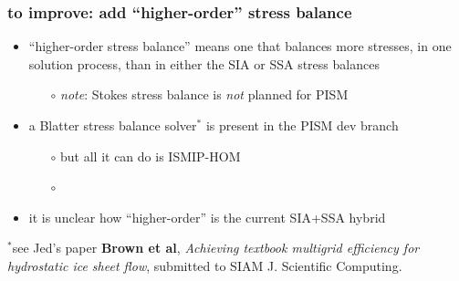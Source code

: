 \documentclass[hide notes,intlimits]{beamer}
\begin{document}
\begin{frame}
  \frametitle{to improve: add ``higher-order'' stress balance}
  \begin{itemize}
  \item ``higher-order stress balance'' means one that balances more stresses, in one solution process, than in either the SIA or SSA stress balances
    \begin{itemize}
    \item[$\circ$]  \emph{note}: Stokes stress balance is \emph{not} planned for PISM
    \end{itemize}
  \item a Blatter stress balance solver$^{*}$ is present in the PISM dev branch
    \begin{itemize}
    \item[$\circ$] but all it can do is ISMIP-HOM
    \item[$\circ$]
    \end{itemize}    
  \item it is unclear how ``higher-order'' is the current SIA+SSA hybrid
  \end{itemize}

 \begin{flushleft}
   \scriptsize
    $^{*}$see Jed's paper \textbf{Brown et al},
    \emph{Achieving textbook multigrid efficiency for hydrostatic ice sheet
      flow}, submitted to SIAM J. Scientific Computing.
  \end{flushleft}
\end{frame}
\end{document}
